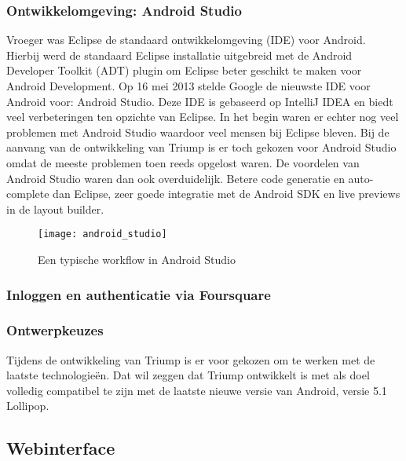 \subsubsection{Ontwikkelomgeving: Android Studio}
Vroeger was Eclipse de standaard ontwikkelomgeving (IDE) voor Android. Hierbij werd de standaard Eclipse installatie uitgebreid met de Android Developer Toolkit (ADT) plugin om Eclipse beter geschikt te maken voor Android Development. Op 16 mei 2013 stelde Google de nieuwste IDE voor Android voor: Android Studio. Deze IDE is gebaseerd op IntelliJ IDEA en biedt veel verbeteringen ten opzichte van Eclipse. In het begin waren er echter nog veel problemen met Android Studio waardoor veel mensen bij Eclipse bleven. Bij de aanvang van de ontwikkeling van Triump is er toch gekozen voor Android Studio omdat de meeste problemen toen reeds opgelost waren.
De voordelen van Android Studio waren dan ook overduidelijk. Betere code generatie en auto-complete dan Eclipse, zeer goede integratie met de Android SDK en live previews in de layout builder. 

\begin{figure}[H]
	\centering
	\texttt{[image: android\_studio]}
	\caption{Een typische workflow in Android Studio}
	\label{fig:Backend ER 2}
\end{figure}

\subsubsection{Inloggen en authenticatie via Foursquare}


\subsubsection{Ontwerpkeuzes}
Tijdens de ontwikkeling van Triump is er voor gekozen om te werken met de laatste technologieën. Dat wil zeggen dat Triump ontwikkelt is met als doel volledig compatibel te zijn met de laatste nieuwe versie van Android, versie 5.1 Lollipop.

\subsection{Webinterface}

